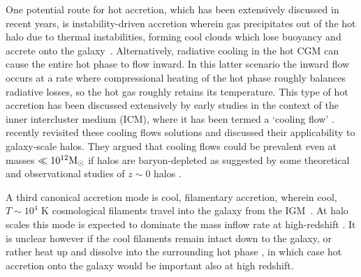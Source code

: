 \documentclass[fleqn,usenatbib]{mnras}
\newcommand{\msun}{{\rm M}_\odot}
\begin{document}
One potential route for hot accretion, which has been extensively discussed in recent years, is instability-driven accretion wherein gas precipitates out of the hot halo due to thermal instabilities, forming cool clouds which lose buoyancy and accrete onto the galaxy~\citep[e.g.][]{Maller2004, Mccourt2012, Voit2015, Armillotta2016, Gronke2019a, Voit2021}.
Alternatively, radiative cooling in the hot CGM can cause the entire hot phase to flow inward.
In this latter scenario the inward flow occurs at a rate where compressional heating of the hot phase roughly balances radiative losses, so the hot gas roughly retains its temperature.
This type of hot accretion has been discussed extensively by early studies in the context of the inner intercluster medium (ICM), where it has been termed a `cooling flow' \citep[][see \citealt{McNamara2007} for a review]{Mathews78, Cowie80, Fabian84, balbus88, Bertschinger1989}. \cite{Stern2019, Stern2020a} recently revisited these cooling flows solutions and discussed  their applicability to galaxy-scale halos.
They argued that cooling flows could be prevalent even at masses $\ll10^{12}\msun$ if halos are baryon-depleted as suggested by some theoretical and observational studies of $z\sim0$ halos \citep[e.g.,][]{Bregman2018, Hafen2019}. 

A third canonical accretion mode is cool, filamentary accretion, wherein cool, $T \sim 10^4$ K cosmological filaments travel into the galaxy from the IGM~\cite[e.g.][]{Keres2005, Dekel2006, Keres2009, Martin2019a}. At halo scales this mode is expected to dominate the mass inflow rate at high-redshift \citep[$z\gtrsim2$, e.g.][]{Keres2009a, Dekel2009, Huscher2020}. It is unclear however if the cool filaments remain intact down to the galaxy, or rather heat up and dissolve into the surrounding hot phase \citep{Nelson2016, Mandelker+}, in which case hot accretion onto the galaxy would be important also at high redshift. 


\end{document}
